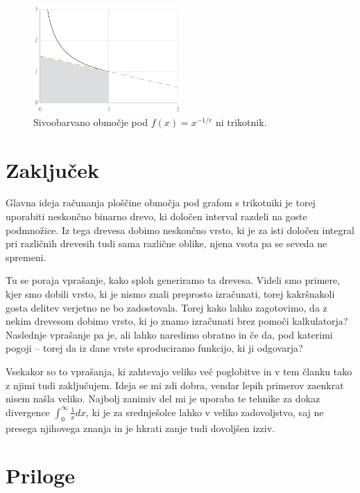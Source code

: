 \documentclass[a4paper, 12pt, titlepage]{article}
\begin{document}
\begin{figure}[h!]
    \centering
    \includegraphics[width=0.5\textwidth]{slike/r_funkcija.png}
    \caption{Sivoobarvano območje pod $ f(x) = x^{-1/r} $ ni trikotnik.}
    \label{r_funkcija}
\end{figure}



\section{Zaključek}

Glavna ideja računanja ploščine območja pod grafom s trikotniki je torej uporabiti neskončno binarno drevo, ki določen interval razdeli na goste podmnožice. Iz tega drevesa dobimo neskončno vrsto, ki je za isti določen integral pri različnih drevesih tudi sama različne oblike, njena vsota pa se seveda ne spremeni.

Tu se poraja vprašanje, kako sploh generiramo ta drevesa. Videli smo primere, kjer smo dobili vrsto, ki je nismo znali preprosto izračunati, torej kakršnakoli gosta delitev verjetno ne bo zadostovala. Torej kako lahko zagotovimo, da z nekim drevesom dobimo vrsto, ki jo znamo izračunati brez pomoči kalkulatorja? Naslednje vprašanje pa je, ali lahko naredimo obratno in če da, pod katerimi pogoji -- torej da iz dane vrste sproduciramo funkcijo, ki ji odgovarja?

Vsekakor so to vprašanja, ki zahtevajo veliko več poglobitve in v tem članku tako z njimi tudi zaključujem. Ideja se mi zdi dobra, vendar lepih primerov zaenkrat nisem našla veliko. Najbolj zanimiv del mi je uporaba te tehnike za dokaz divergence $ \int_0^\infty \frac{1}{x} dx $, ki je za srednješolce lahko v veliko zadovoljstvo, saj ne presega njihovega znanja in je hkrati zanje tudi dovoljšen izziv.

\newpage
\section*{Priloge} \label{priloga}
%
\end{document}
